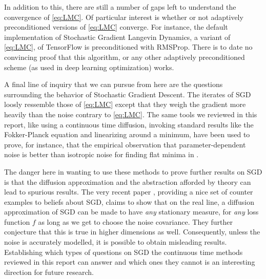 \documentclass[10pt,journal,a4paper]{IEEEtran}
\theoremstyle{definition}
\begin{document}
In addition to this, there are still a number of gaps left to understand the convergence of \eqref{eq:LMC}. Of particular interest is whether or not adaptively preconditioned versions of \eqref{eq:LMC} converge. For instance, the default implementation of Stochastic Gradient Langevin Dynamics, a variant of \eqref{eq:LMC}, of TensorFlow is preconditioned with RMSProp. There is to date no convincing proof that this algorithm, or any other adaptively preconditioned scheme (as used in deep learning optimization) works.  

A final line of inquiry that we can pursue from here are the questions surrounding the behavior of Stochastic Gradient Descent. The iterates of SGD loosly ressemble those of \eqref{eq:LMC} except that they weigh the gradient more heavily than the noise contrary to \eqref{eq:LMC}. The same tools we reviewed in this report, like using a continuous time diffusion, invoking standard results like the Fokker-Planck equation and linearizing around a minimum, have been used to prove, for instance, that the empirical observation that parameter-dependent noise is better than isotropic noise for finding flat minima in \cite{xie_diffusion_2020}. 

The danger here in wanting to use these methods to prove further results on SGD is that the diffusion approximation and the abstraction afforded by theory can lead to spurious results. The very recent paper \cite{ziyin_sgd_2021}, providing a nice set of counter examples to beliefs about SGD, claims to show that on the real line, a diffusion approximation of SGD can be made to have \textit{any} stationary measure, for \textit{any} loss function $f$ as long as we get to choose the noise covariance. They further conjecture that this is true in higher dimensions as well. Consequently, unless the noise is accurately modelled, it is possible to obtain misleading results. Establishing which types of questions on SGD the continuous time methods reviewed in this report can answer and which ones they cannot is an interesting direction for future research. 

%
%
\end{document}
